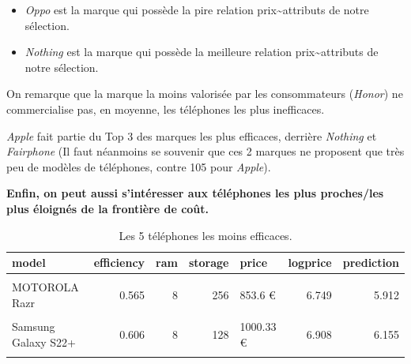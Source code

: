 \documentclass[
  12pt,
]{report}
\providecommand{\tightlist}{%
  \setlength{\itemsep}{0pt}\setlength{\parskip}{0pt}}\usepackage{longtable,booktabs,array}
\begin{document}
\begin{itemize}
\tightlist
\item
  \emph{Oppo} est la marque qui possède la pire relation
  prix\textasciitilde attributs de notre sélection.
\item
  \emph{Nothing} est la marque qui possède la meilleure relation
  prix\textasciitilde attributs de notre sélection.
\end{itemize}

On remarque que la marque la moins valorisée par les consommateurs
(\emph{Honor}) ne commercialise pas, en moyenne, les téléphones les plus
inefficaces.

\emph{Apple} fait partie du Top 3 des marques les plus efficaces,
derrière \emph{Nothing} et \emph{Fairphone} (Il faut néanmoins se
souvenir que ces 2 marques ne proposent que très peu de modèles de
téléphones, contre 105 pour \emph{Apple}).

\textbf{Enfin, on peut aussi s'intéresser aux téléphones les plus
proches/les plus éloignés de la frontière de coût.}

\begin{table}[!h]

\caption{\label{tab:worst}Les 5 téléphones les moins efficaces.}
\centering
\begin{tabular}[t]{lrrrlrr}
\toprule
\textbf{model} & \textbf{efficiency} & \textbf{ram} & \textbf{storage} & \textbf{price} & \textbf{logprice} & \textbf{prediction}\\
\midrule
\cellcolor{gray!6}{OPPO Find X5} & \cellcolor{gray!6}{0.564} & \cellcolor{gray!6}{8} & \cellcolor{gray!6}{256} & \cellcolor{gray!6}{1022.14 €} & \cellcolor{gray!6}{6.930} & \cellcolor{gray!6}{6.090}\\
MOTOROLA Razr & 0.565 & 8 & 256 & 853.6 € & 6.749 & 5.912\\
\cellcolor{gray!6}{OPPO A77} & \cellcolor{gray!6}{0.572} & \cellcolor{gray!6}{4} & \cellcolor{gray!6}{64} & \cellcolor{gray!6}{359.16 €} & \cellcolor{gray!6}{5.884} & \cellcolor{gray!6}{5.061}\\
Samsung Galaxy S22+ & 0.606 & 8 & 128 & 1000.33 € & 6.908 & 6.155\\
\cellcolor{gray!6}{Samsung XCOVER 5} & \cellcolor{gray!6}{0.608} & \cellcolor{gray!6}{4} & \cellcolor{gray!6}{64} & \cellcolor{gray!6}{299 €} & \cellcolor{gray!6}{5.700} & \cellcolor{gray!6}{4.950}\\
\bottomrule
\end{tabular}
\end{table}
\end{document}
